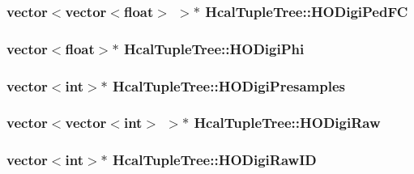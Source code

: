 \subsubsection[{H\+O\+Digi\+Ped\+F\+C}]{\setlength{\rightskip}{0pt plus 5cm}vector$<$vector$<$float$>$ $>$$\ast$ Hcal\+Tuple\+Tree\+::\+H\+O\+Digi\+Ped\+F\+C}\label{class_hcal_tuple_tree_af4ae835aebd4b9754cde9868afed4d7d}
\hypertarget{class_hcal_tuple_tree_a31ee04dc7198ca962dfaf857a6e19339}{}
\subsubsection[{H\+O\+Digi\+Phi}]{\setlength{\rightskip}{0pt plus 5cm}vector$<$float$>$$\ast$ Hcal\+Tuple\+Tree\+::\+H\+O\+Digi\+Phi}\label{class_hcal_tuple_tree_a31ee04dc7198ca962dfaf857a6e19339}
\hypertarget{class_hcal_tuple_tree_a419defccb7894e4a204632feef490ccf}{}
\subsubsection[{H\+O\+Digi\+Presamples}]{\setlength{\rightskip}{0pt plus 5cm}vector$<$int$>$$\ast$ Hcal\+Tuple\+Tree\+::\+H\+O\+Digi\+Presamples}\label{class_hcal_tuple_tree_a419defccb7894e4a204632feef490ccf}
\hypertarget{class_hcal_tuple_tree_ad1871cbc92384941dfc7824c9d3066ea}{}
\subsubsection[{H\+O\+Digi\+Raw}]{\setlength{\rightskip}{0pt plus 5cm}vector$<$vector$<$int$>$ $>$$\ast$ Hcal\+Tuple\+Tree\+::\+H\+O\+Digi\+Raw}\label{class_hcal_tuple_tree_ad1871cbc92384941dfc7824c9d3066ea}
\hypertarget{class_hcal_tuple_tree_aa5b1adb6d1e454dbaa1c2ea8c6d1ce17}{}
\subsubsection[{H\+O\+Digi\+Raw\+I\+D}]{\setlength{\rightskip}{0pt plus 5cm}vector$<$int$>$$\ast$ Hcal\+Tuple\+Tree\+::\+H\+O\+Digi\+Raw\+I\+D}\label{class_hcal_tuple_tree_aa5b1adb6d1e454dbaa1c2ea8c6d1ce17}
\hypertarget{class_hcal_tuple_tree_a760900f2eccc37b9c8efc78b6af457fa}{}
